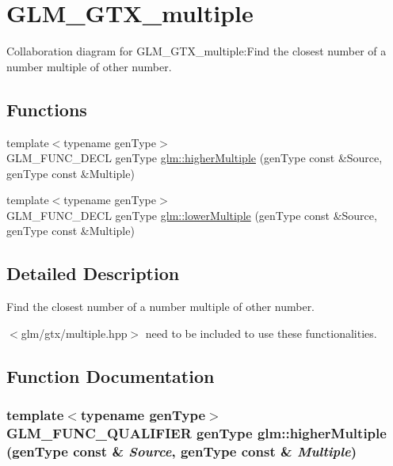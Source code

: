 \hypertarget{group__gtx__multiple}{
\section{GLM\_\-GTX\_\-multiple}
\label{group__gtx__multiple}
}


Collaboration diagram for GLM\_\-GTX\_\-multiple:Find the closest number of a number multiple of other number.  
\subsection*{Functions}
\begin{CompactItemize}
\item 
{\footnotesize template$<$typename genType$>$ }\\GLM\_\-FUNC\_\-DECL genType \hyperlink{group__gtx__multiple_gbd0db4e77a64ac833046cbbeb6fc5bf3}{glm::higherMultiple} (genType const \&Source, genType const \&Multiple)
\item 
{\footnotesize template$<$typename genType$>$ }\\GLM\_\-FUNC\_\-DECL genType \hyperlink{group__gtx__multiple_gecccd82257351764e3c2bec8973458e3}{glm::lowerMultiple} (genType const \&Source, genType const \&Multiple)
\end{CompactItemize}


\subsection{Detailed Description}
Find the closest number of a number multiple of other number. 

$<$glm/gtx/multiple.hpp$>$ need to be included to use these functionalities. 

\subsection{Function Documentation}
\hypertarget{group__gtx__multiple_gbd0db4e77a64ac833046cbbeb6fc5bf3}{
\subsubsection[higherMultiple]{\setlength{\rightskip}{0pt plus 5cm}template$<$typename genType$>$ GLM\_\-FUNC\_\-QUALIFIER genType glm::higherMultiple (genType const \& {\em Source}, \/  genType const \& {\em Multiple})}}
\label{group__gtx__multiple_gbd0db4e77a64ac833046cbbeb6fc5bf3}


